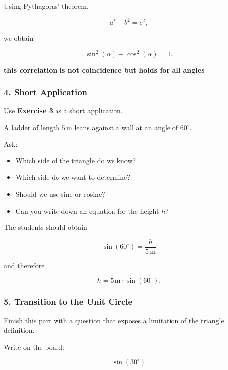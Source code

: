 \documentclass[a4paper,11pt]{article}
\begin{document}
Using Pythagoras' theorem,

\begin{equation}
    a^2+b^2=c^2,
\end{equation}

we obtain

\begin{equation}
    \boxed{\sin^2(\alpha)+\cos^2(\alpha)=1}.
\end{equation}

\textbf{this correlation is not coincidence but holds for all angles }

\subsubsection*{4. Short Application}

Use \textbf{Exercise 3} as a short application.

A ladder of length $5\,\mathrm{m}$ leans against a wall at an angle of
$60^\circ$.

Ask:

\begin{itemize}
    \item Which side of the triangle do we know?
    \item Which side do we want to determine?
    \item Should we use sine or cosine?
    \item Can you write down an equation for the height $h$?
\end{itemize}

The students should obtain

\begin{equation}
    \sin(60^\circ)=\frac{h}{5\,\mathrm{m}}
\end{equation}

and therefore

\begin{equation}
    h=5\,\mathrm{m}\cdot\sin(60^\circ).
\end{equation}


\subsubsection*{5. Transition to the Unit Circle}

Finish this part with a question that exposes a limitation of the triangle
definition.

Write on the board:

\begin{equation}
    \sin(30^\circ)
\end{equation}
\end{document}
